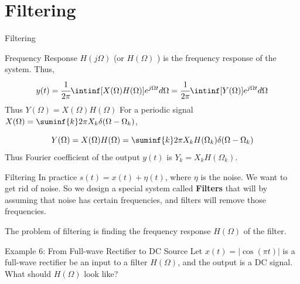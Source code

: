 \documentclass[aspectratio=169,xcolor=dvipsnames,svgnames,x11names,fleqn]{beamer}
\begin{document}
    

\section{Filtering}


\begin{frame}{}
    \begin{center}
    \Huge \bf \color{DarkBlue}
    \faFlask
    
 Filtering

\end{center}
\end{frame}

\begin{frame}{Frequency Response}
    $H(j\Omega)$ (or $H(\Omega)$ ) is the frequency response of the system. Thus,
    $$
    y(t) = \cfrac{1}{2\pi} \intinf [ X(\Omega)H(\Omega)]e^{j\Omega t}d\Omega =  \cfrac{1}{2\pi} \intinf [ Y(\Omega)]e^{j\Omega t}d\Omega
    $$
    Thus $Y(\Omega) = X(\Omega)H(\Omega)$
    For a periodic signal $X(\Omega) = \suminf{k} 2\pi X_k \delta(\Omega - \Omega_k)$,

    $$
    Y(\Omega) =  X(\Omega)H(\Omega) =  \suminf{k} 2\pi X_kH(\Omega_k) \delta(\Omega - \Omega_k)
    $$
    Thus Fourier coefficient of the output $y(t)$ is $Y_k = X_k H(\Omega_k)$.
\end{frame}

\begin{frame}{Filtering}
    In practice $s(t)  = x(t) + \eta(t)$, where $\eta$ is the noise. We want to get rid of noise. So we design a special system called \textbf{Filters} that will by assuming that noise has certain frequencies, and filters will remove those frequencies.

    The problem of filtering is finding the frequency response $H(\Omega)$ of the filter.
\end{frame}

\begin{frame}{Example 6: From Full-wave Rectifier to DC Source}
Let $x(t) = |\cos(\pi t) | $ is a full-wave rectifier be an input to a filter $H(\Omega)$, and the output is a DC signal. What should  $H(\Omega)$ look like?
    
\end{frame}
\end{document}
